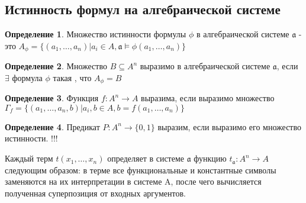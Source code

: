 \documentclass[a4paper]{article}
\theoremstyle{definition}
\newtheorem*{definition}{Определение}
\theoremstyle{remark}
\begin{document}
    \subsection{Истинность формул на алгебраической системе}
    \begin{definition}
        Множество истинности формулы $\phi$ в алгебраической системе $\mathfrak{a}$ - это
        $A_\phi = \{(a_1, \dots, a_n) | a_i \in A, \mathfrak{a}\models \phi(a_1, \dots, a_n)\} $
    \end{definition}
    \begin{definition}
        Множество $B\subseteq A^n$ выразимо в алгебраической системе $\mathfrak{a}$, если 
        $\exists$ формула $\phi$ такая , что $A_\phi = B$
    \end{definition}
    \begin{definition}
        Функция $f:A^n \to A$ выразима, если выразимо множество $\Gamma_f = \{ (a_1, \dots, a_n, b) | a_i, b \in A, b = f(a_1, \dots, a_n)\} $
    \end{definition}
    \begin{definition}
        Предикат $P:A^n \to \{ 0, 1\} $ выразим, если выразимо его множество истинности. !!!
    \end{definition}
    Каждый терм $t(x_1,\dots, x_n)$ определяет в системе $\mathfrak{a}$ функцию $t_{\mathfrak{a}}: A^n \rightarrow A$
    следующим образом: в терме все функциональные и 
    константные символы заменяются на их интерпретации в системе A, после чего 
    вычисляется полученная суперпозиция от входных аргументов.
    
\end{document}
